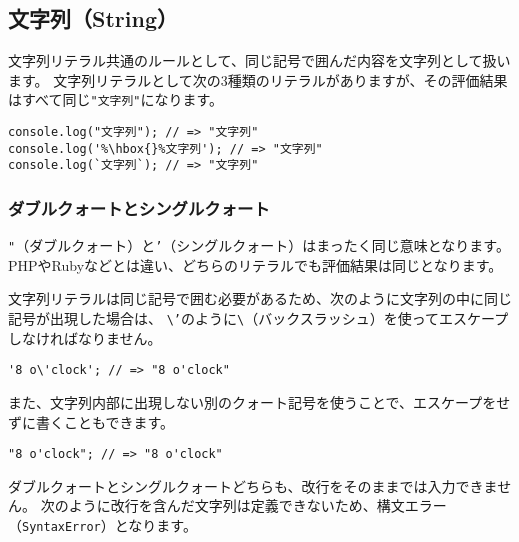 \hypertarget{string-literal}{%
\subsection{文字列（String）}\label{string-literal}}

文字列リテラル共通のルールとして、同じ記号で囲んだ内容を文字列として扱います。
文字列リテラルとして次の3種類のリテラルがありますが、その評価結果はすべて同じ\texttt{"文字列"}になります。

\begin{lstlisting}[escapechar=\%]
console.log("文字列"); // => "文字列"
console.log('%\hbox{}%文字列'); // => "文字列"
console.log(`文字列`); // => "文字列"
\end{lstlisting}

\hypertarget{double-quote-and-single-quote}{%
\subsubsection{ダブルクォートとシングルクォート}\label{double-quote-and-single-quote}}

\texttt{"}（ダブルクォート）と\texttt{'}（シングルクォート）はまったく同じ意味となります。
PHPやRubyなどとは違い、どちらのリテラルでも評価結果は同じとなります。

文字列リテラルは同じ記号で囲む必要があるため、次のように文字列の中に同じ記号が出現した場合は、
\texttt{\textbackslash'}のように\texttt{\textbackslash}\index{\\@\texttt{\textbackslash}}（バックスラッシュ）を使ってエスケープしなければなりません。

\begin{lstlisting}
'8 o\'clock'; // => "8 o'clock"
\end{lstlisting}

\enlargethispage{\baselineskip}また、文字列内部に出現しない別のクォート記号を使うことで、エスケープをせずに書くこともできます。

\begin{lstlisting}
"8 o'clock"; // => "8 o'clock"
\end{lstlisting}

ダブルクォートとシングルクォートどちらも、改行をそのままでは入力できません。
次のように改行を含んだ文字列は定義できないため、構文エラー（\texttt{SyntaxError}）となります。


